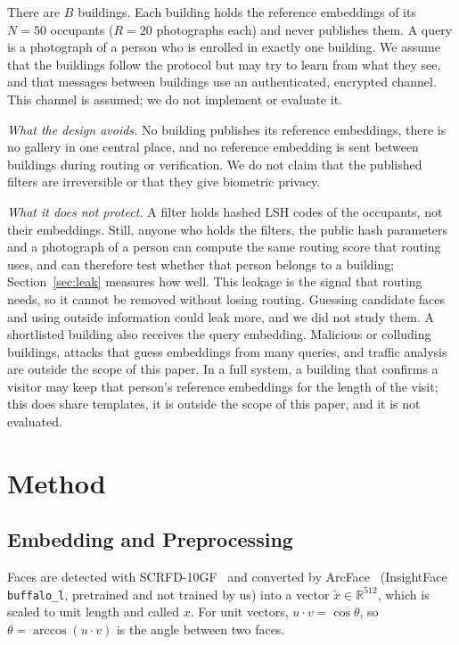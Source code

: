 \documentclass[runningheads]{llncs}
\newcommand{\code}[1]{\texttt{#1}}
\begin{document}
There are $B$ buildings. Each building holds the reference embeddings of its $N=50$ occupants ($R=20$ photographs
each) and never publishes them. A query is a photograph of a person who is enrolled in exactly one building. We
assume that the buildings follow the protocol but may try to learn from what they see, and that messages between
buildings use an authenticated, encrypted channel. This channel is assumed; we do not implement or evaluate it.

\emph{What the design avoids.} No building publishes its reference embeddings, there is no gallery in one central
place, and no reference embedding is sent between buildings during routing or verification. We do not claim that the
published filters are irreversible or that they give biometric privacy.

\emph{What it does not protect.} A filter holds hashed LSH codes of the occupants, not their embeddings. Still,
anyone who holds the filters, the public hash parameters and a photograph of a person can compute the same routing
score that routing uses, and can therefore test whether that person belongs to a building; Section~\ref{sec:leak}
measures how well. This leakage is the signal that routing needs, so it cannot be removed without losing routing.
Guessing candidate faces and using outside information could leak more, and we did not study them. A shortlisted
building also receives the query embedding. Malicious or colluding buildings, attacks that guess embeddings from many
queries, and traffic analysis are outside the scope of this paper. In a full system, a building that confirms a
visitor may keep that person's reference embeddings for the length of the visit; this does share templates, it is
outside the scope of this paper, and it is not evaluated.

\section{Method}
\label{sec:method}

\subsection{Embedding and Preprocessing}

Faces are detected with SCRFD-10GF~\cite{guo2022} and converted by ArcFace~\cite{deng2019} (InsightFace
\code{buffalo\_l}, pretrained and not trained by us) into a vector $\tilde{x}\in\mathbb{R}^{512}$, which is scaled
to unit length and called $x$. For unit vectors, $u\cdot v=\cos\theta$, so $\theta=\arccos(u\cdot v)$ is the angle
between two faces.
\end{document}
